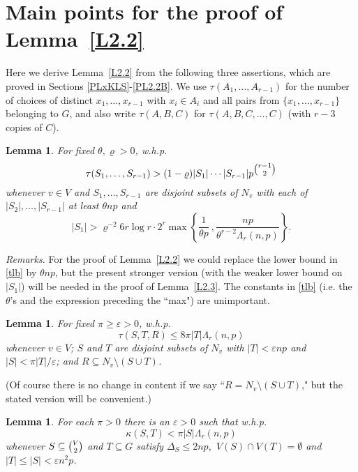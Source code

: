 \documentclass[letterpaper,11pt]{article}
\newtheorem{lemma}[thm]{Lemma}
\newcommand{\beq}[1]{\begin{equation}\label{#1}}
\newcommand{\enq}[0]{\end{equation}}
\newcommand{\mn}[0]{\medskip\noindent}
\newcommand{\nin}[0]{\noindent}
\newcommand{\sub}[0]{\subseteq}
\newcommand{\sm}[0]{\setminus}
\renewcommand{\dots}[0]{,\ldots,}
\newcommand{\0}[0]{\emptyset}
\newcommand{\Cc}[0]{\tbinom}
\newcommand{\gD}[0]{\Delta }
\newcommand{\gk}[0]{\kappa }
\newcommand{\gL}[0]{\Lambda}
\newcommand{\eps}[0]{\varepsilon }
\newcommand{\vr}[0]{\varrho}
\newcommand{\glr}[0]{\gL_r(n,p)}
\begin{document}
\section{Main points for the proof of Lemma~\ref{L2.2}}\label{S2.2}

Here we derive Lemma~\ref{L2.2} from the following three
assertions, which are proved in Sections \ref{PLxKLS}-\ref{PL2.2B}.
%
We use
$\tau(A_1\dots A_{r-1})$ for the number of choices of distinct
$x_1\dots x_{r-1}$ with $x_i\in A_i$ and
all pairs from $\{x_1\dots x_{r-1}\}$ belonging to $G$,
and also
write
$\tau(A,B,C)$ for $\tau(A,B,C\dots C)$ (with $r-3$ copies of $C$).

\begin{lemma} \label{xKLS}
For fixed $\theta, \vr>0$,
w.h.p.
\beq{tRST}
\tau(S_1\dots S_{r-1}) >
(1-\vr) |S_1|\cdots |S_{r-1}|p^{\Cc{r-1}{2}}
\enq
whenever $v\in V$ and $S_1\dots S_{r-1}$ are disjoint subsets
of $N_v$ with each of $|S_2|\dots |S_{r-1}|$
at least $\theta np$ and
\beq{tlb}
|S_1|> \vr^{-2}6r\log r\cdot2^r
\max\left\{\frac{1}{\theta p}~,\frac{np}{\theta^{r-2}\glr}\right\}.
\enq
\end{lemma}


\mn
{\em Remarks.}
For the proof of Lemma~\ref{L2.2} we could
replace
the lower bound in
\eqref{tlb} by $\theta np$,
but the present stronger version
(with the weaker lower bound on $|S_1|$)
will be needed in the
proof of Lemma~\ref{L2.3}.
The constants in \eqref{tlb} (i.e. the $\theta$'s and the expression preceding the ``max") are unimportant.



\begin{lemma}\label{xKLS'}
For fixed $\pi\geq\eps >0$,
w.h.p.
\beq{TRST}
\tau(S,T,R) \leq 8\pi |T| \glr
\enq
whenever $v\in V$; $S$ and $T$ are disjoint subsets
of $N_v$ with $|T| < \eps np$ and
$|S|< \pi |T|/\eps$; and $R\sub N_v\sm (S\cup T)$.
\end{lemma}

\nin
(Of course there is no change in content if we say
``$R= N_v\sm (S\cup T)$," but
the stated version will be convenient.)

\begin{lemma}\label{L2.2B}
For each $\pi>0$ there is an $\eps>0$ such that w.h.p.
\beq{kappaST}
\kappa(S,T) < \pi|S|\glr
\enq
whenever
$S\sub \Cc{V}{2} $ and $T\sub G$ satisfy
$\gD_S\leq 2np,$ $V(S)\cap V(T) = \0$
and
$|T|\leq |S|<\eps n^2p$.
\end{lemma}
\end{document}
